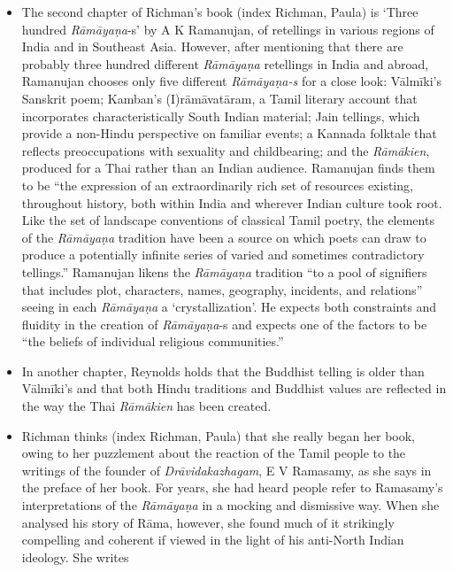 \begin{itemize}
\item The second chapter of Richman’s book (index Richman, Paula) is ‘Three hundred \textit{Rāmāyaṇa}-s’ by A K Ramanujan, of retellings in various regions of India and in Southeast Asia. However, after mentioning that there are probably three hundred different \textit{Rāmāyaṇa } retellings in India and abroad, Ramanujan chooses only five different \textit{Rāmāyaṇa-s} for a close look: Vālmīki's Sanskrit poem; Kamban's (I)rāmāvatāram, a Tamil literary account that incorporates characteristically South Indian material; Jain tellings, which provide a non-Hindu perspective on familiar events; a Kannada folktale that reflects preoccupations with sexuality and childbearing; and the \textit{Rāmākien}, produced for a Thai rather than an Indian audience. Ramanujan finds them to be “the expression of an extraordinarily rich set of resources existing, throughout history, both within India and wherever Indian culture took root. Like the set of landscape conventions of classical Tamil poetry, the elements of the \textit{Rāmāyaṇa} tradition have been a source on which poets can draw to produce a potentially infinite series of varied and sometimes contradictory tellings.” Ramanujan likens the \textit{Rāmāyaṇa} tradition “to a pool of signifiers that includes plot, characters, names, geography, incidents, and relations” seeing in each \textit{Rāmāyaṇa} a ‘crystallization’. He expects both constraints and fluidity in the creation of \textit{Rāmāyaṇa}-s and expects one of the factors to be “the beliefs of individual religious communities.”

 \item In another chapter, Reynolds holds that the Buddhist telling is older than Vālmīki’s and that both Hindu traditions and Buddhist values are reflected in the way the Thai \textit{Rāmākien} has been created.

 \item Richman thinks (index Richman, Paula) that she really began her book, owing to her puzzlement about the reaction of the Tamil people to the writings of the founder of \textit{Drāvidakazhagam}, E V Ramasamy, as she says in the preface of her book. For years, she had heard people refer to Ramasamy’s interpretations of the \textit{Rāmāyaṇa} in a mocking and dismissive way. When she analysed his story of Rāma, however, she found much of it strikingly compelling and coherent if viewed in the light of his anti-North Indian ideology. She writes

\end{itemize}

